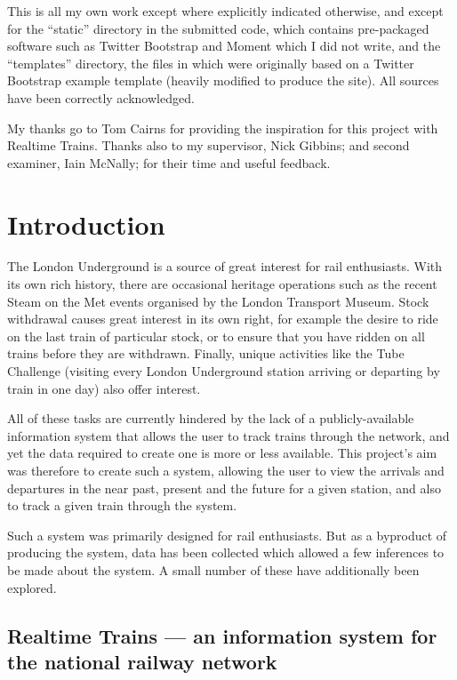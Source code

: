 \documentclass[a4paper,12pt,twoside]{report}
\begin{document}
This is all my own work except where explicitly indicated otherwise, and except
for the ``static'' directory in the submitted code, which contains pre-packaged
software such as Twitter Bootstrap and Moment which I did not write, and the
``templates'' directory, the files in which were originally based on a Twitter
Bootstrap example template (heavily modified to produce the site). All sources
have been correctly acknowledged. 

My thanks go to Tom Cairns for providing the inspiration for this project with
Realtime Trains. Thanks also to my supervisor, Nick Gibbins; and second
examiner, Iain McNally; for their time and useful feedback.

\pagebreak

\chapter{Introduction}

The London Underground is a source of great interest for rail enthusiasts. With
its own rich history, there are occasional heritage operations such as the
recent Steam on the Met events organised by the London Transport Museum. Stock
withdrawal causes great interest in its own right, for example the desire to
ride on the last train of particular stock, or to ensure that you have ridden
on all trains before they are withdrawn. Finally, unique activities like the
Tube Challenge (visiting every London Underground station arriving or departing
by train in one day) also offer interest.

All of these tasks are currently hindered by the lack of a publicly-available
information system that allows the user to track trains through the network,
and yet the data required to create one is more or less available. This
project's aim was therefore to create such a system, allowing the user to view
the arrivals and departures in the near past, present and the future for a
given station, and also to track a given train through the system.

Such a system was primarily designed for rail enthusiasts. But as a byproduct
of producing the system, data has been collected which allowed a few inferences
to be made about the system. A small number of these have additionally been
explored.

\section{Realtime Trains --- an information system for the national railway
network}
\end{document}
